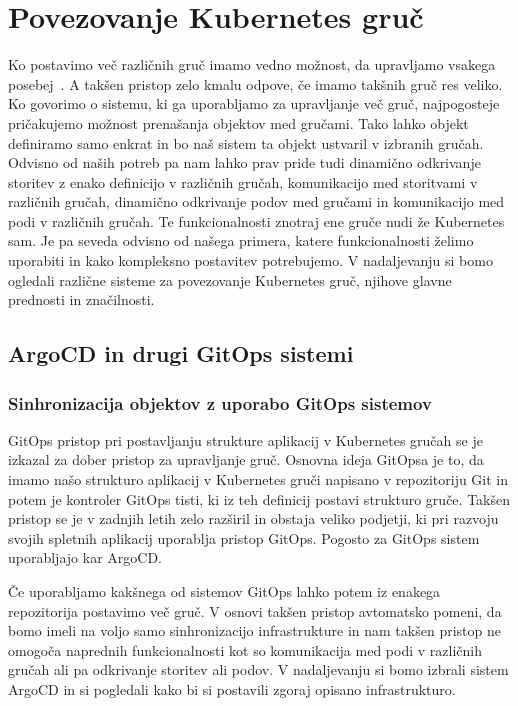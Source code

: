 \documentclass[a4paper, 12pt]{book}
\begin{document}
\chapter{Povezovanje Kubernetes gruč}
Ko postavimo več različnih gruč imamo vedno možnost, da upravljamo vsakega posebej~\cite{difference-multi-cluster}.
A takšen pristop zelo kmalu odpove, če imamo takšnih gruč res veliko.
Ko govorimo o sistemu, ki ga uporabljamo za upravljanje več gruč, najpogosteje pričakujemo možnost prenašanja objektov med gručami.
Tako lahko objekt definiramo samo enkrat in bo naš sistem ta objekt ustvaril v izbranih gručah.
Odvisno od naših potreb pa nam lahko prav pride tudi  dinamično odkrivanje storitev z enako definicijo v različnih gručah, komunikacijo med storitvami v različnih gručah, dinamično odkrivanje podov med gručami in komunikacijo med podi v različnih gručah.
Te funkcionalnosti znotraj ene gruče nudi že Kubernetes sam.
Je pa seveda odvisno od našega primera, katere funkcionalnosti želimo uporabiti in kako kompleksno postavitev potrebujemo.
V nadaljevanju si bomo ogledali različne sisteme za povezovanje Kubernetes gruč, njihove glavne prednosti in značilnosti.
\section{ArgoCD in drugi GitOps sistemi}
\subsection{Sinhronizacija objektov z uporabo GitOps sistemov}
GitOps pristop pri postavljanju strukture aplikacij v Kubernetes gručah se je izkazal za dober pristop za upravljanje gruč.
Osnovna ideja GitOpsa je to, da imamo našo strukturo aplikacij v Kubernetes gruči napisano v repozitoriju Git in potem je kontroler GitOps tisti, ki iz teh definicij postavi strukturo gruče.
Takšen pristop se je v zadnjih letih zelo razširil in obstaja veliko podjetji, ki pri razvoju svojih spletnih aplikacij uporablja pristop GitOps.
Pogosto za GitOps sistem uporabljajo kar ArgoCD.

Če uporabljamo kakšnega od sistemov GitOps lahko potem iz enakega repozitorija postavimo več gruč.
V osnovi takšen pristop avtomatsko pomeni, da bomo imeli na voljo samo sinhronizacijo infrastrukture in nam takšen pristop ne omogoča naprednih funkcionalnosti kot so komunikacija med podi v različnih gručah ali pa odkrivanje storitev ali podov.
V nadaljevanju si bomo izbrali sistem ArgoCD in si pogledali kako bi si postavili zgoraj opisano infrastrukturo.
\end{document}
